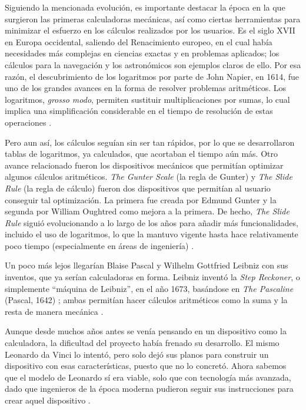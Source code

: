 \documentclass[letterpaper,12pt,oneside]{book}
\begin{document}
		Siguiendo la mencionada evolución, es importante destacar la época en la que surgieron las primeras calculadoras mecánicas, así
		como ciertas herramientas para minimizar el esfuerzo en los cálculos realizados por los usuarios. Es el siglo XVII en Europa occidental,
		saliendo del Renacimiento europeo, en el cual había necesidades más complejas en ciencias exactas y en problemas aplicados; los
		cálculos para la navegación y los astronómicos son ejemplos claros de ello. Por esa razón, el descubrimiento de
		los logaritmos por parte de John Napier, en 1614, fue uno de los grandes avances en la forma de resolver problemas aritméticos.
		Los logaritmos, \textit{grosso modo}, permiten sustituir multiplicaciones por sumas, lo cual implica una simplificación considerable
		en el tiempo de resolución de estas operaciones \cite[p. 24]{oregan_brief_2012}.
  
        Pero aun así, los cálculos seguían sin ser tan rápidos,
		por lo que se desarrollaron tablas de logaritmos, ya calculados, que acortaban el tiempo aún más. Otro avance relacionado fueron los dispositivos 	mecánicos que permitían optimizar algunos cálculos aritméticos. 
		\textit{The Gunter Scale} (la regla de Gunter) y \textit{The Slide Rule} (la regla de cálculo) fueron dos dispositivos que
		permitían al usuario conseguir tal optimización.
		La primera fue creada por Edmund Gunter y la segunda por William Oughtred como mejora a la primera. De hecho, \textit{The Slide Rule} siguió evolucionando a lo largo de los años para añadir más
		funcionalidades, incluido el uso de logaritmos, lo que la mantuvo vigente hasta hace relativamente poco tiempo (especialmente en áreas de ingeniería) \cite[p.24 y p. 96]{oregan_brief_2012}.		
 
  
		 Un poco más lejos llegarían Blaise Pascal y Wilhelm Gottfried Leibniz con sus inventos, que ya serían calculadoras en forma. Leibniz inventó la
		\textit{Step Reckoner}, o simplemente ``máquina de Leibniz'', en el año 1673, basándose en \textit{The Pascaline} (Pascal, 1642) ; 	
		ambas permitían hacer cálculos 
		aritméticos como la suma y la resta de manera mecánica \cite[p.25]{oregan_brief_2012}. 
		
		Aunque desde muchos años 
		antes se venía pensando
		en un dispositivo como la calculadora, la dificultad del proyecto había frenado su desarrollo. El mismo Leonardo da Vinci lo intentó, pero solo dejó sus planos para construir un dispositivo con esas características, puesto que no lo concretó. Ahora sabemos que el modelo de Leonardo sí era viable, solo que con tecnología más avanzada,
        dado que ingenieros de la época moderna pudieron seguir sus instrucciones para crear aquel dispositivo \cite{california_state_university_historical_nodate}.
  
\end{document}
